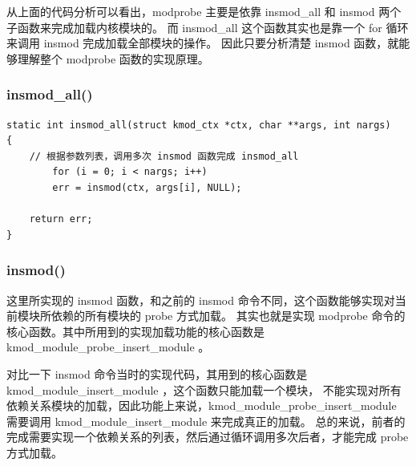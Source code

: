 从上面的代码分析可以看出，modprobe 主要是依靠 insmod\_all 和 insmod
两个子函数来完成加载内核模块的。 而 insmod\_all 这个函数其实也是靠一个
for 循环来调用 insmod 完成加载全部模块的操作。 因此只要分析清楚 insmod
函数，就能够理解整个 modprobe 函数的实现原理。

\subsubsection{insmod\_all()}

{\begin{shaded}\begin{verbatim}
static int insmod_all(struct kmod_ctx *ctx, char **args, int nargs)
{
    // 根据参数列表，调用多次 insmod 函数完成 insmod_all
        for (i = 0; i < nargs; i++) 
        err = insmod(ctx, args[i], NULL);

    return err;
}
\end{verbatim}\end{shaded}}
\subsubsection{insmod()}

这里所实现的 insmod 函数，和之前的 insmod
命令不同，这个函数能够实现对当前模块所依赖的所有模块的 probe 方式加载。
其实也就是实现 modprobe
命令的核心函数。其中所用到的实现加载功能的核心函数是
kmod\_module\_probe\_insert\_module 。

对比一下 insmod 命令当时的实现代码，其用到的核心函数是
kmod\_module\_insert\_module ，这个函数只能加载一个模块，
不能实现对所有依赖关系模块的加载，因此功能上来说，kmod\_module\_probe\_insert\_module
需要调用 kmod\_module\_insert\_module 来完成真正的加载。
总的来说，前者的完成需要实现一个依赖关系的列表，然后通过循环调用多次后者，才能完成
probe 方式加载。

